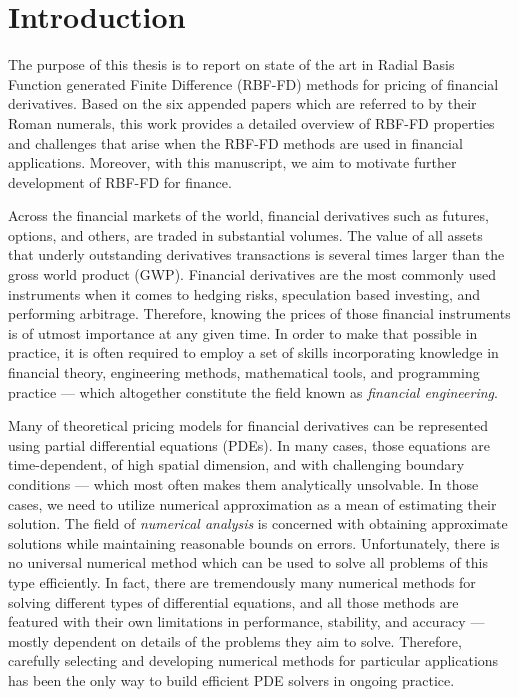 \documentclass{UUThesisTemplate}
\begin{document}
\chapter{Introduction}
\label{ch:introduction}
\par The purpose of this thesis is to report on state of the art in Radial Basis Function generated Finite Difference (RBF-FD) methods for pricing of financial derivatives. Based on the six appended papers which are referred to by their Roman numerals, this work provides a detailed overview of RBF-FD properties and challenges that arise when the RBF-FD methods are used in financial applications. Moreover, with this manuscript, we aim to motivate further development of RBF-FD for finance.
\par Across the financial markets of the world, financial derivatives such as futures, options, and others, are traded in substantial volumes. The value of all assets that underly outstanding derivatives transactions is several times larger than the gross world product (GWP). Financial derivatives are the most commonly used instruments when it comes to hedging risks, speculation based investing, and performing arbitrage. Therefore, knowing the prices of those financial instruments is of utmost importance at any given time. In order to make that possible in practice, it is often required to employ a set of skills incorporating knowledge in financial theory, engineering methods, mathematical tools, and programming practice --- which altogether constitute the field known as \emph{financial engineering}. 
\par Many of theoretical pricing models for financial derivatives can be represented using partial differential equations (PDEs). In many cases, those equations are time-dependent, of high spatial dimension, and with challenging boundary conditions --- which most often makes them analytically unsolvable. In those cases, we need to utilize numerical approximation as a mean of estimating their solution. The field of \emph{numerical analysis} is concerned with obtaining approximate solutions while maintaining reasonable bounds on errors. Unfortunately, there is no universal numerical method which can be used to solve all problems of this type efficiently. In fact, there are tremendously many numerical methods for solving different types of differential equations, and all those methods are featured with their own limitations in performance, stability, and accuracy --- mostly dependent on details of the problems they aim to solve. Therefore, carefully selecting and developing numerical methods for particular applications has been the only way to build efficient PDE solvers in ongoing practice. 
\end{document}
